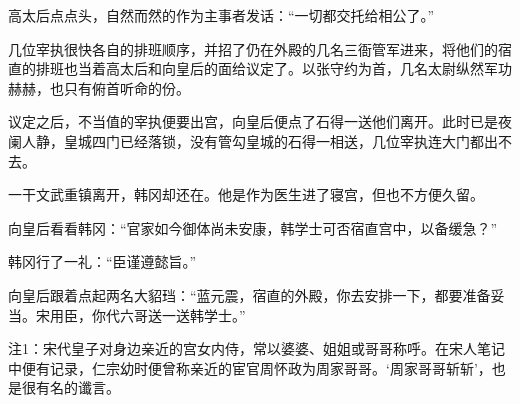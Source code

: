 高太后点点头，自然而然的作为主事者发话：“一切都交托给相公了。”

几位宰执很快各自的排班顺序，并招了仍在外殿的几名三衙管军进来，将他们的宿直的排班也当着高太后和向皇后的面给议定了。以张守约为首，几名太尉纵然军功赫赫，也只有俯首听命的份。

议定之后，不当值的宰执便要出宫，向皇后便点了石得一送他们离开。此时已是夜阑人静，皇城四门已经落锁，没有管勾皇城的石得一相送，几位宰执连大门都出不去。

一干文武重镇离开，韩冈却还在。他是作为医生进了寝宫，但也不方便久留。

向皇后看看韩冈：“官家如今御体尚未安康，韩学士可否宿直宫中，以备缓急？”

韩冈行了一礼：“臣谨遵懿旨。”

向皇后跟着点起两名大貂珰：“蓝元震，宿直的外殿，你去安排一下，都要准备妥当。宋用臣，你代六哥送一送韩学士。”

注1：宋代皇子对身边亲近的宫女内侍，常以婆婆、姐姐或哥哥称呼。在宋人笔记中便有记录，仁宗幼时便曾称亲近的宦官周怀政为周家哥哥。‘周家哥哥斩斩’，也是很有名的谶言。
